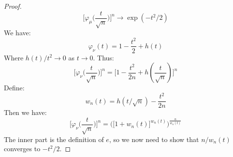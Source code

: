 \begin{proof}
\begin{equation}
                        \Big[\varphi_{\mu}\big(\frac{t}{\sqrt{n}}\big)
                            \Big]^{n}\rightarrow\exp(\minus{t}^{2}/2)
                    \end{equation}
                    We have:
                    \begin{equation}
                        \varphi_{\nu}(t)=1-\frac{t^{2}}{2}+h(t)
                    \end{equation}
                    Where $h(t)/t^{2}\rightarrow{0}$ as
                    $t\rightarrow{0}$. Thus:
                    \begin{equation}
                        \Big[\varphi_{\nu}\big(\frac{t}{\sqrt{n}}
                            \big)\Big]^{n}=
                        \Big[1-\frac{t^{2}}{2n}+h(\frac{t}{\sqrt{n}})
                            \Big]^{n}
                    \end{equation}
                    Define:
                    \begin{equation}
                        w_{n}(t)=h(t/\sqrt{n})-\frac{t^{2}}{2n}
                    \end{equation}
                    Then we have:
                    \begin{equation}
                        \Big[\varphi_{\nu}\big(\frac{t}{\sqrt{n}}
                            \big)\Big]^{n}
                        =\Big(\Big[1+w_{n}(t)\Big]^{w_{n}(t)}
                            \Big)^{\frac{n}{w_{n}(t)}}
                    \end{equation}
                    The inner part is the definition of $e$, so we
                    now need to show that $n/w_{n}(t)$ converges to
                    $\minus{t}^{2}/2$.
                \end{proof}